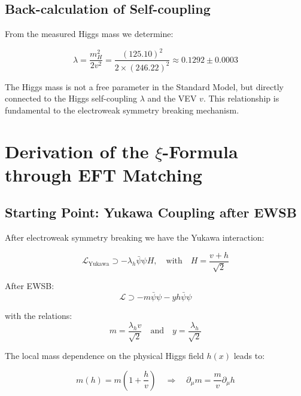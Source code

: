 	\subsection{Back-calculation of Self-coupling}
	
	From the measured Higgs mass we determine:
	
	\begin{equation}
		\lambda = \frac{m_H^2}{2v^2} = \frac{(125.10)^2}{2 \times (246.22)^2} \approx 0.1292 \pm 0.0003
	\end{equation}
	
	\begin{important}
		The Higgs mass is not a free parameter in the Standard Model, but directly connected to the Higgs self-coupling $\lambda$ and the VEV $v$. This relationship is fundamental to the electroweak symmetry breaking mechanism.
	\end{important}
	
	\section{Derivation of the $\xi$-Formula through EFT Matching}
	
	\subsection{Starting Point: Yukawa Coupling after EWSB}
	
	After electroweak symmetry breaking we have the Yukawa interaction:
	
	\begin{equation}
		\mathcal{L}_{\text{Yukawa}} \supset -\lambda_h \bar{\psi}\psi H, \quad \text{with} \quad H = \frac{v + h}{\sqrt{2}}
	\end{equation}
	
	After EWSB:
	\begin{equation}
		\mathcal{L} \supset -m \bar{\psi}\psi - y h \bar{\psi}\psi
	\end{equation}
	
	with the relations:
	\begin{equation}
		m = \frac{\lambda_h v}{\sqrt{2}} \quad \text{and} \quad y = \frac{\lambda_h}{\sqrt{2}}
	\end{equation}
	
	The local mass dependence on the physical Higgs field $h(x)$ leads to:
	
	\begin{equation}
		m(h) = m\left(1 + \frac{h}{v}\right) \quad \Rightarrow \quad \partial_\mu m = \frac{m}{v}\partial_\mu h
	\end{equation}
	
